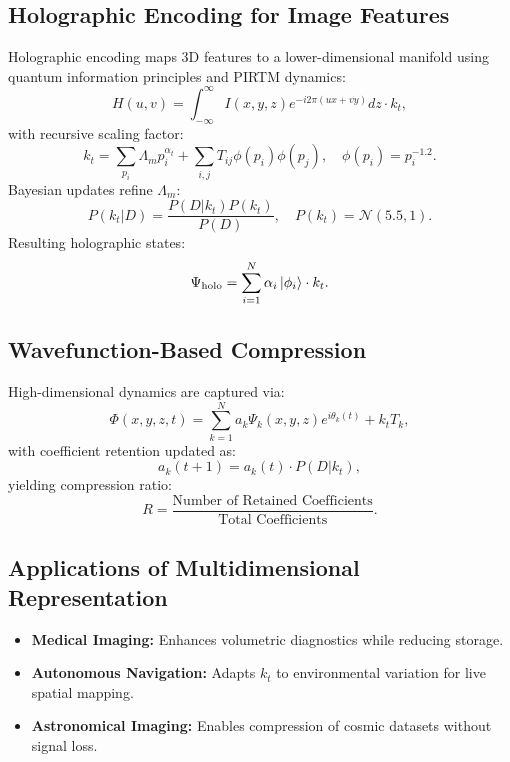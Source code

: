 \documentclass{article}
\theoremstyle{plain}
\begin{document}
\subsection{Holographic Encoding for Image Features}
Holographic encoding maps 3D features to a lower-dimensional manifold using quantum information principles and PIRTM dynamics:
\begin{equation}
H(u, v) = \int_{-\infty}^\infty I(x, y, z) e^{-i2\pi(ux + vy)} dz \cdot k_t,
\end{equation}
with recursive scaling factor:
\begin{equation}
k_t = \sum_{p_i} \Lambda_m p_i^{\alpha_t} + \sum_{i,j} T_{ij} \phi(p_i) \phi(p_j), \quad \phi(p_i) = p_i^{-1.2}.
\end{equation}
Bayesian updates refine \( \Lambda_m \):
\begin{equation}
P(k_t | D) = \frac{P(D | k_t) P(k_t)}{P(D)}, \quad P(k_t) = \mathcal{N}(5.5, 1).
\end{equation}
Resulting holographic states:
\begin{equation}
\Psi_\text{holo} = \sum_{i=1}^{N} \alpha_i \ket{\phi_i} \cdot k_t.
\end{equation}

\subsection{Wavefunction-Based Compression}
High-dimensional dynamics are captured via:
\begin{equation}
\Phi(x, y, z, t) = \sum_{k=1}^{N} a_k \Psi_k(x, y, z) e^{i\theta_k(t)} + k_t T_k,
\end{equation}
with coefficient retention updated as:
\begin{equation}
a_k(t+1) = a_k(t) \cdot P(D | k_t),
\end{equation}
yielding compression ratio:
\begin{equation}
R = \frac{\text{Number of Retained Coefficients}}{\text{Total Coefficients}}.
\end{equation}

\subsection{Applications of Multidimensional Representation}
\begin{itemize}
    \item \textbf{Medical Imaging:} Enhances volumetric diagnostics while reducing storage.
    \item \textbf{Autonomous Navigation:} Adapts \( k_t \) to environmental variation for live spatial mapping.
    \item \textbf{Astronomical Imaging:} Enables compression of cosmic datasets without signal loss.
\end{itemize}
\end{document}
